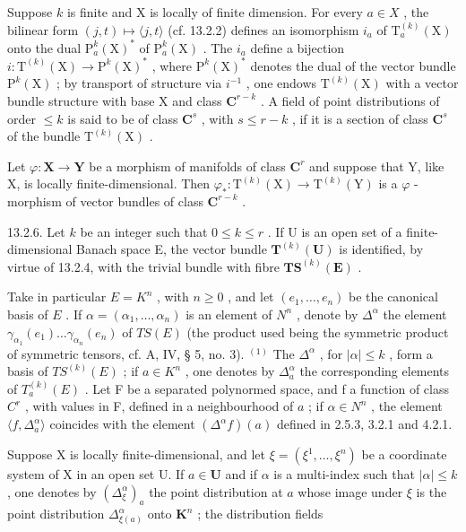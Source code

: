 Suppose \(k\) is finite and X is locally of finite dimension. For every \(a \in X\) , the bilinear form \((j, t) \mapsto \langle j, t \rangle\) (cf. 13.2.2) defines an isomorphism \(i_a\) of \(\mathrm{T}_a^{(k)}(\mathrm{X})\) onto the dual \(\mathrm{P}_a^k(\mathrm{X})^*\) of \(\mathrm{P}_a^k(\mathrm{X})\) . The \(i_a\) define a bijection \(i: \mathrm{T}^{(k)}(\mathrm{X}) \to \mathrm{P}^k(\mathrm{X})^*\) , where \(\mathrm{P}^k(\mathrm{X})^*\) denotes the dual of the vector bundle \(\mathrm{P}^k(\mathrm{X})\) ; by transport of structure via \(i^{-1}\) , one endows \(\mathrm{T}^{(k)}(\mathrm{X})\) with a vector bundle structure with base X and class \(\mathbf{C}^{r-k}\) . A field of point distributions of order \(\leqslant k\) is said to be of class \(\mathbf{C}^s\) , with \(s \leqslant r - k\) , if it is a section of class \(\mathbf{C}^s\) of the bundle \(\mathrm{T}^{(k)}(\mathrm{X})\) .

Let \(\varphi\colon\mathbf{X}\to\mathbf{Y}\) be a morphism of manifolds of class \(\mathbf{C}^{r}\) and suppose that Y, like X, is locally finite-dimensional. Then \(\varphi_{*}\colon\mathrm{T}^{(k)}(\mathrm{X})\to\mathrm{T}^{(k)}(\mathrm{Y})\) is a \(\varphi\) -morphism of vector bundles of class \(\mathbf{C}^{r-k}\) .

13.2.6. Let \(k\) be an integer such that \(0 \leqslant k \leqslant r\) . If U is an open set of a finite-dimensional Banach space E, the vector bundle \(\mathbf{T}^{(k)}(\mathbf{U})\) is identified, by virtue of 13.2.4, with the trivial bundle with fibre \(\mathbf{TS}^{(k)}(\mathbf{E})\) .

Take in particular \(E = K^n\) , with \(n \geqslant 0\) , and let \((e_1, \ldots, e_n)\) be the canonical basis of \(E\) . If \(\alpha = (\alpha_1, \ldots, \alpha_n)\) is an element of \(N^n\) , denote by \(\Delta^\alpha\) the element \(\gamma_{\alpha_1}(e_1) \ldots \gamma_{\alpha_n}(e_n)\) of \(TS(E)\) (the product used being the symmetric product of symmetric tensors, cf. A, IV, § 5, no. 3). \(^{(1)}\) The \(\Delta^\alpha\) , for \(|\alpha| \leqslant k\) , form a basis of \(TS^{(k)}(E)\) ; if \(a \in K^n\) , one denotes by \(\Delta_a^\alpha\) the corresponding elements of \(T_a^{(k)}(E)\) . Let F be a separated polynormed space, and f a function of class \(C^r\) , with values in F, defined in a neighbourhood of \(a\) ; if \(\alpha \in N^n\) , the element \(\langle f, \Delta_a^\alpha \rangle\) coincides with the element \((\Delta^\alpha f)(a)\) defined in 2.5.3, 3.2.1 and 4.2.1.

Suppose X is locally finite-dimensional, and let \(\xi = (\xi^1, \ldots, \xi^n)\) be a coordinate system of X in an open set U. If \(a \in \mathbf{U}\) and if \(\alpha\) is a multi-index such that \(|\alpha| \leqslant k\) , one denotes by \((\Delta_{\xi}^{\alpha})_a\) the point distribution at \(a\) whose image under \(\xi\) is the point distribution \(\Delta_{\xi(a)}^{\alpha}\) onto \(\mathbf{K}^n\) ; the distribution fields

